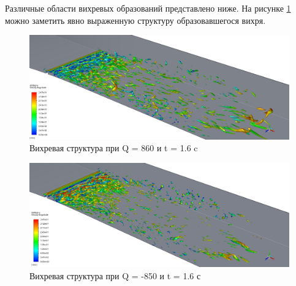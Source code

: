 	Различные области вихревых образований представлено ниже. На рисунке \ref{fig:q860-t16} можно заметить явно выраженную структуру образовавшегося вихря. 
	\begin{figure}[H]
		\centering
		\includegraphics[width=1\linewidth]{../Assets/Q860-t16}
		\caption{Вихревая структура при Q = 860 и t = 1.6 c}
		\label{fig:q860-t16}
	\end{figure}
	\begin{figure}[H]
		\centering
		\includegraphics[width=1\linewidth]{../Assets/QM850-t16}
		\caption{Вихревая структура при Q = -850 и t = 1.6 с}
		\label{fig:qm850-t16}
	\end{figure}
	
